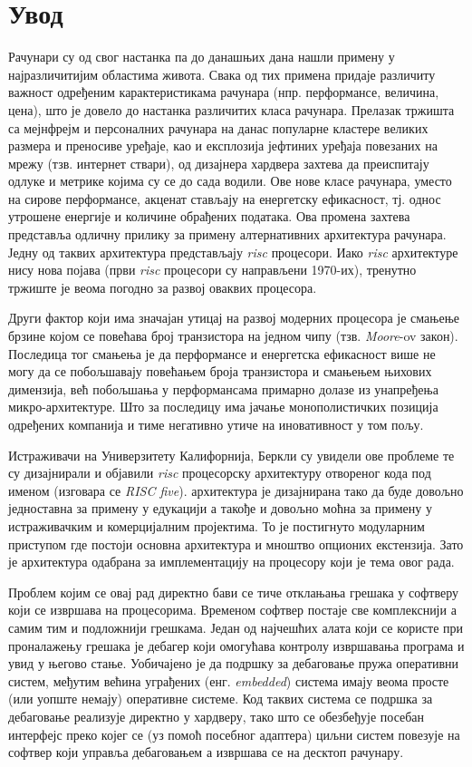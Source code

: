 \chapter{Увод}

Рачунари су од свог настанка па до данашњих дана нашли примену у најразличитијим областима живота.
Свака од тих примена придаје различиту важност одређеним карактеристикама рачунара (нпр. перформансе, величина, цена),
што је довело до настанка различитих класа рачунара. Прелазак тржишта са мејнфрејм и персоналних рачунара на данас популарне кластере великих размера и преносиве уређаје, као и експлозија јефтиних уређаја повезаних на мрежу (тзв. интернет ствари), од дизајнера хардвера захтева да преиспитају одлуке и метрике којима су се до сада водили.
Ове нове класе рачунара, уместо на сирове перформансе, акценат стављају на енергетску ефикасност, тј. однос утрошене енергије и количине обрађених података.
Ова промена захтева представља одличну прилику за примену алтернативних архитектура рачунара. Једну од таквих архитектура представљају \textit{\acrfull{risc}} процесори. Иако  \textit{\acrshort{risc}} архитектуре нису нова појава (први \textit{\acrshort{risc}} процесори су направљени 1970-их), тренутно тржиште је веома погодно за развој оваквих процесора.

Други фактор који има значајан утицај на развој модерних процесора је смањење брзине којом се повећава број транзистора на једном чипу (тзв. \textit{Moore}-ov закон).
Последица тог смањења је да перформансе и енергетска ефикасност више не могу да се побољшавају повећањем броја транзистора и смањењем њихових димензија, већ побољшања у перформансама примарно долазе из унапређења микро-архитектуре. Што за последицу има јачање монополистичких позиција одређених компанија и тиме негативно утиче на иновативност у том пољу.

Истраживачи на Универзитету Калифорнија, Беркли су увидели ове проблеме те су дизајнирали и објавили \textit{\acrshort{risc}} процесорску архитектуру отвореног кода под именом  \cite{riscv} (изговара се \textit{RISC five}).  архитектура је дизајнирана тако да буде довољно једноставна за примену у едукацији а такође и довољно моћна за примену у истраживачким \cite{rocket} и комерцијалним \cite{sifive} \cite{tenstorrent} пројектима. То је постигнуто модуларним приступом где постоји основна архитектура и мноштво опционих екстензија. Зато је  архитектура одабрана за имплементацију на процесору који је тема овог рада.

Проблем којим се овај рад директно бави се тиче отклањања грешака у софтверу који се извршава на  процесорима.
Временом софтвер постаје све комплекснији а самим тим и подложнији грешкама. 
Један од најчешћих алата који се користе при проналажењу грешака је дебагер који омогућава контролу извршавања програма и увид у његово стање.
Уобичајено је да подршку за дебаговање пружа оперативни систем, међутим већина уграђених (енг. \textit{embedded}) система имају веома просте (или уопште немају) оперативне системе.
Код таквих система се подршка за дебаговање реализује директно у хардверу, тако што се обезбеђује посебан интерфејс преко којег се (уз помоћ посебног адаптера) циљни систем повезује на софтвер који управља дебаговањем а извршава се на десктоп рачунару.

